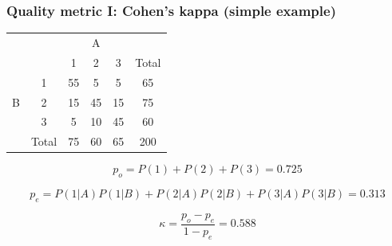 \begin{frame}\frametitle{Quality metric I: Cohen's kappa (simple example)}
\footnotesize
\begin{table}[]
\centering
\begin{tabular}{c|c|c|c|c|c}
\cline{3-5}
\multicolumn{2}{c|}{\multirow{2}{*}{}}           & \multicolumn{3}{c|}{A} &                            \\ \cline{3-6} 
\multicolumn{2}{c|}{}                            & 1      & 2     & 3     & \multicolumn{1}{c|}{Total} \\ \hline
\multicolumn{1}{|c|}{\multirow{3}{*}{B}} & 1     & 55     & 5     & 5     & \multicolumn{1}{c|}{65}    \\ \cline{2-6} 
\multicolumn{1}{|c|}{}                   & 2     & 15     & 45    & 15    & \multicolumn{1}{c|}{75}    \\ \cline{2-6} 
\multicolumn{1}{|c|}{}                   & 3     & 5      & 10    & 45    & \multicolumn{1}{c|}{60}    \\ \hline
                                         & Total & 75     & 60    & 65    & \multicolumn{1}{c|}{200}   \\ \cline{2-6} 
\end{tabular}
\end{table}

\par \[ p_o = P(1)+P(2)+P(3) = 0.725 \]
\par \[ p_e = P(1|A)P(1|B)+P(2|A)P(2|B)+P(3|A)P(3|B) = 0.313 \]
\par \[ \kappa = \frac{p_o - p_e}{1 - p_e} = 0.588 \]

\end{frame}

